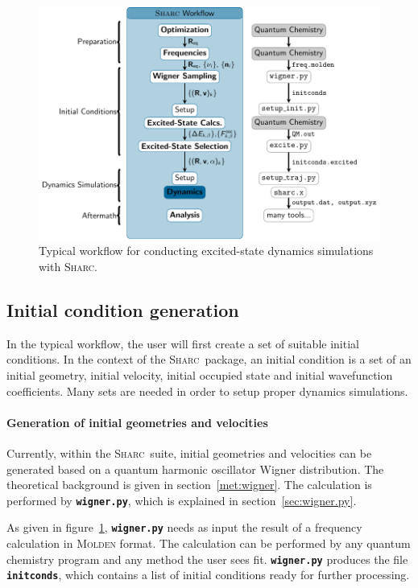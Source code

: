 \documentclass[a4paper,11pt,DIV=15,openany,twoside=false]{scrbook}
\newcommand{\sharc}{\textsc{Sharc}}
\newcommand{\ttt}[1]{\textbf{\texttt{#1}}}
\begin{document}
\begin{figure}[h!]
  \centering
  \includegraphics[scale=1]{img/workflow/prepare.pdf}
  \caption{Typical workflow for conducting excited-state dynamics simulations with \sharc.}
  \label{fig:workflow}
\end{figure}

\subsection{Initial condition generation}

In the typical workflow, the user will first create a set of suitable initial conditions. In the context of the \sharc\ package, an initial condition is a set of an initial geometry, initial velocity, initial occupied state and initial wavefunction coefficients. 
Many sets are needed in order to setup proper dynamics simulations.

\paragraph{Generation of initial geometries and velocities}

Currently, within the \sharc\ suite, initial geometries and velocities can be generated based on a quantum harmonic oscillator Wigner distribution. The theoretical background is given in section~\ref{met:wigner}. The calculation is performed by \ttt{wigner.py}, which is explained in section~\ref{sec:wigner.py}. 

As given in figure~\ref{fig:workflow}, \ttt{wigner.py} needs as input the result of a frequency calculation in \textsc{Molden} format. The calculation can be performed by any quantum chemistry program and any method the user sees fit. 
\ttt{wigner.py} produces the file \ttt{initconds}, which contains a list of initial conditions ready for further processing.
\end{document}
